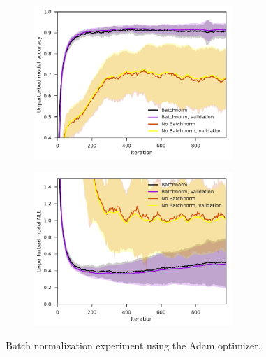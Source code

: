 \begin{figure}[bp!]
    \begin{subfigure}[b]{0.49\textwidth}
        \centering
        \includegraphics[height=5.8cm]{graphics/E017-bn-analysis/accuracy_unp-all-series-mean-sd.pdf}
        \caption{}
        \label{fig: Theory: E017-bn-analysis/accuracy_unp-all-series-mean-sd}
    \end{subfigure}
    \hfill
    \begin{subfigure}[b]{0.49\textwidth}
        \centering
        \includegraphics[height=5.8cm]{graphics/E017-bn-analysis/return_unp-all-series-mean-sd.pdf}
        \caption{}
        \label{fig: Theory: E017-bn-analysis/return_unp-all-series-mean-sd}
    \end{subfigure}
    \caption{Batch normalization experiment using the Adam optimizer.}
    \label{fig: Theory: E017-bn-analysis}
\end{figure}
